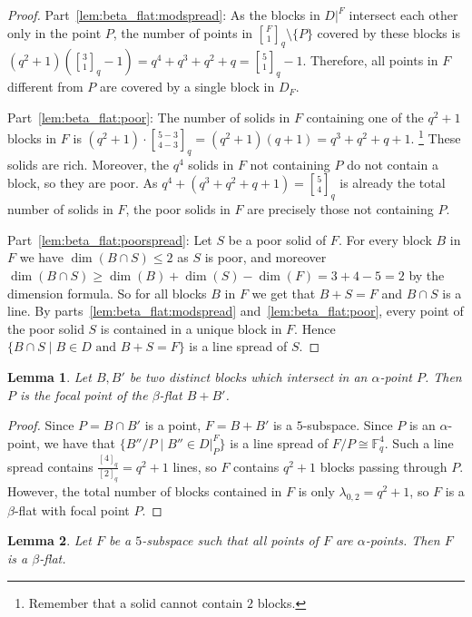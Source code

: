 \documentclass[a4paper,abstracton,12pt]{scrartcl}
\newcommand{\F}{\mathbb{F}}
\newcommand{\qbinom}[3]{\genfrac{[}{]}{0pt}{}{#1}{#2}_{#3}}
\newtheorem{lemma}{Lemma}[section]
\theoremstyle{definition}
\theoremstyle{remark}
\begin{document}
\begin{proof}
Part~\ref{lem:beta_flat:modspread}:
As the blocks in $D|^F$ intersect each other only in the point $P$, the number of points in $\qbinom{F}{1}{q}\setminus \{P\}$ covered by these blocks is $(q^2 + 1)(\qbinom{3}{1}{q} - 1) = q^4 + q^3 + q^2 + q = \qbinom{5}{1}{q}-1$.
Therefore, all points in $F$ different from $P$ are covered by a single block in $D_F$.

Part~\ref{lem:beta_flat:poor}:
The number of solids in $F$ containing one of the $q^2 + 1$ blocks in $F$ is $(q^2 + 1)\cdot \qbinom{5-3}{4-3}{q} = (q^2 + 1)(q + 1) = q^3 + q^2 + q + 1$.%
\footnote{Remember that a solid cannot contain $2$ blocks.}
These solids are rich.
Moreover, the $q^4$ solids in $F$ not containing $P$ do not contain a block, so they are poor.
As $q^4 + (q^3 + q^2 + q + 1) = \qbinom{5}{4}{q}$ is already the total number of solids in $F$, the poor solids in $F$ are precisely those not containing $P$.

Part~\ref{lem:beta_flat:poorspread}:
Let $S$ be a poor solid of $F$.
For every block $B$ in $F$ we have $\dim(B \cap S) \leq 2$ as $S$ is poor, and moreover $\dim(B \cap S) \geq \dim(B) + \dim(S) - \dim(F) = 3 + 4 - 5 = 2$ by the dimension formula.
So for all blocks $B$ in $F$ we get that $B + S = F$ and $B \cap S$ is a line.
By parts~\ref{lem:beta_flat:modspread} and~\ref{lem:beta_flat:poor}, every point of the poor solid $S$ is contained in a unique block in $F$.
Hence $\{B \cap S \mid B\in D \text{ and }B + S = F\}$ is a line spread of $S$.
\end{proof}

\begin{lemma}
	\label{lem:alpha_to_beta}
	Let $B,B'$ be two distinct blocks which intersect in an $\alpha$-point $P$.
	Then $P$ is the focal point of the $\beta$-flat $B + B'$.
\end{lemma}

\begin{proof}
	Since $P = B \cap B'$ is a point, $F = B + B'$ is a $5$-subspace.
	Since $P$ is an $\alpha$-point, we have that $\{B'' / P \mid B''\in D|^F_P\}$ is a line spread of $F / P \cong \F_q^4$.
	Such a line spread contains $\frac{[4]_q}{[2]_q} = q^2 + 1$ lines, so $F$ contains $q^2 + 1$ blocks passing through $P$.
	However, the total number of blocks contained in $F$ is only $\lambda_{0,2} = q^2 + 1$, so $F$ is a $\beta$-flat with focal point $P$.
\end{proof}

\begin{lemma}
	\label{lem:4flat_to_point}
	Let $F$ be a $5$-subspace such that all points of $F$ are $\alpha$-points.
	Then $F$ is a $\beta$-flat.
\end{lemma}
\end{document}
